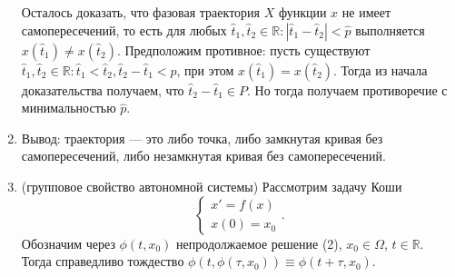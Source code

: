 \begin{enumerate}
        Осталось доказать, что фазовая траектория $X$ функции $x$ не имеет самопересечений, то есть для любых $\widehat t_1, \widehat t_2 \in \mathbb{R} : |\widehat t_1 - \widehat t_2| < \widehat{p}$ выполняется $x(\widehat t_1) \neq x(\widehat t_2)$.
        Предположим противное: пусть существуют $\widehat t_1, \widehat t_2 \in \mathbb{R}: \widehat t_1 < \widehat t_2, \widehat t_2 - \widehat t_1 < \widehat p$, при этом $x(\widehat t_1) = x(\widehat t_2)$. Тогда из начала доказательства получаем, что $\widehat t_2 - \widehat t_1 \in P$. Но тогда получаем противоречие с минимальностью $\widehat p$.

        \QED

    \item Вывод: траектория --- это либо точка, либо замкнутая кривая без самопересечений, либо незамкнутая кривая без самопересечений.


    \item (групповое свойство автономной системы) Рассмотрим задачу Коши
        \begin{equation}
            \begin{cases}
                x' = f(x) \\
                x(0) = x_0
            \end{cases}.
        \end{equation}
        Обозначим через $\phi(t, x_0)$ непродолжаемое решение (2), $x_0 \in \Omega$, $t \in \mathbb{R}$.
    Тогда справедливо тождество $\phi(t, \phi(\tau, x_0)) \equiv \phi(t + \tau, x_0)$.
        




\end{enumerate}
